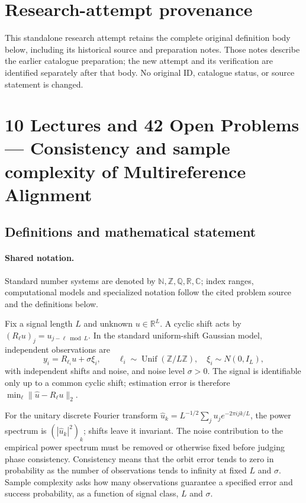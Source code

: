 \documentclass[11pt]{article}
\begin{document}
\section*{Research-attempt provenance}
This standalone research attempt retains the complete original definition body below,
including its historical source and preparation notes. Those notes describe the
earlier catalogue preparation; the new attempt and its verification are identified
separately after that body. No original ID, catalogue status, or source statement is changed.

\section{10 Lectures and 42 Open Problems — Consistency and sample complexity of Multireference Alignment}\label{statement}

\subsection{Definitions and mathematical statement}

\paragraph{Shared notation.}Standard number systems are denoted by $\mathbb N,\mathbb Z,\mathbb Q,\mathbb R,\mathbb C$; index ranges, computational models and specialized notation follow the cited problem source and the definitions below.


Fix a signal length $L$ and unknown $u\in\mathbb{R}^L$. A cyclic shift acts by $(R_\ell u)_j=u_{j-\ell\bmod L}$. In the standard uniform-shift Gaussian model, independent observations are
\[
 y_i=R_{\ell_i}u+\sigma\xi_i,\qquad
 \ell_i\sim\operatorname{Unif}(\mathbb{Z}/L\mathbb{Z}),\quad
 \xi_i\sim N(0,I_L),
\]
with independent shifts and noise, and noise level $\sigma>0$. The signal is identifiable only up to a common cyclic shift; estimation error is therefore $\min_\ell\|\widehat u-R_\ell u\|_2$.

For the unitary discrete Fourier transform $\widehat u_k=L^{-1/2}\sum_j u_j e^{-2\pi i jk/L}$, the power spectrum is $(|\widehat u_k|^2)_k$; shifts leave it invariant. The noise contribution to the empirical power spectrum must be removed or otherwise fixed before judging phase consistency. Consistency means that the orbit error tends to zero in probability as the number of observations tends to infinity at fixed $L$ and $\sigma$. Sample complexity asks how many observations guarantee a specified error and success probability, as a function of signal class, $L$ and $\sigma$.
\end{document}
